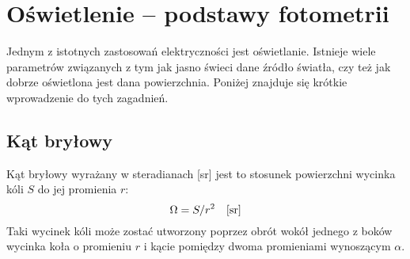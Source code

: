 % 
% 
% 
% 

\section{Oświetlenie – podstawy fotometrii}

Jednym z istotnych zastosowań elektryczności jest oświetlanie.
Istnieje wiele parametrów związanych z tym jak jasno świeci dane źródło światła, czy też jak dobrze oświetlona jest dana powierzchnia.
Poniżej znajduje się krótkie wprowadzenie do tych zagadnień.

\subsection{Kąt bryłowy}

Kąt bryłowy wyrażany w steradianach [sr] jest to stosunek powierzchni wycinka kóli $S$ do jej promienia $r$: $$\Omega = S / r^2 \quad [{\rm sr}]$$
Taki wycinek kóli może zostać utworzony poprzez obrót wokół jednego z boków wycinka koła o promieniu $r$ i kącie pomiędzy dwoma promieniami wynoszącym $\alpha$.

